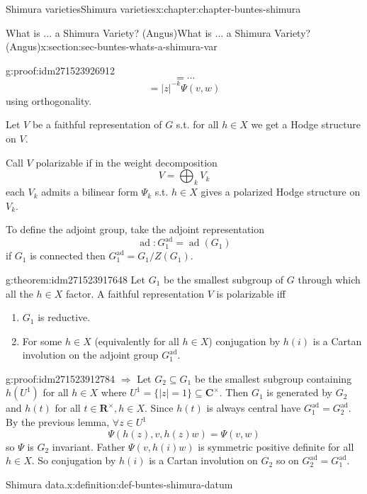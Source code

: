\documentclass[oneside,10pt,]{book}
\numberwithin{equation}{section}
\newcommand{\RR}{\mathbf{R}}
\newcommand{\CC}{\mathbf{C}}
\DeclareMathOperator{\ad}{ad}
\begin{document}
\begin{chapterptx}{Shimura varieties}{}{Shimura varieties}{}{}{x:chapter:chapter-buntes-shimura}
\begin{sectionptx}{What is ... a Shimura Variety? (Angus)}{}{What is ... a Shimura Variety? (Angus)}{}{}{x:section:sec-buntes-whats-a-shimura-var}
\begin{proofptx}{}{g:proof:idm271523926912}
\begin{equation*}
= \cdots
\end{equation*}
%
\begin{equation*}
= |z|^{-k} \Psi(v,w)
\end{equation*}
using orthogonality.%
\end{proofptx}
Let \(V \) be a faithful representation of \(G \) s.t. for all \(h\in X\) we get  a Hodge structure on \(V\).%
\par
Call \(V\) polarizable if in the weight decomposition%
\begin{equation*}
V = \bigoplus_k V_k
\end{equation*}
each \(V_k\) admits a bilinear form \(\Psi_k\) s.t. \(h \in X\) gives a polarized Hodge structure on \(V_k\).%
\par
To define the adjoint group, take the adjoint representation%
\begin{equation*}
\ad \colon G_1^{\ad} = \ad(G_1)
\end{equation*}
if \(G_1\) is connected then \(G_1^{\ad} = G_1 /Z(G_1)\).%
\begin{theorem}{}{}{g:theorem:idm271523917648}%
Let \(G_1\) be the smallest subgroup of \(G\) through  which all the \(h \in X\) factor. A faithful representation \(V\) is polarizable iff%
\begin{enumerate}
\item{}\(G_1\) is reductive.%
\item{}For some \(h \in X\) (equivalently for all \(h \in X\)) conjugation by \(h(i)\) is a Cartan involution on the adjoint group \(G_1^{\ad}\).%
\end{enumerate}
%
\end{theorem}
\begin{proofptx}{}{g:proof:idm271523912784}
\(\Rightarrow\) Let \(G_2 \subseteq G_1\) be the smallest subgroup containing \(h(U^1)\) for all \(h \in X\) where \(U^1 = \{|z| = 1\} \subseteq \CC^\times\). Then \(G_1\) is generated by \(G_2\) and \(h(t)\) for all \(t \in \RR^\times, h \in X\). Since \(h(t)\) is always central have \(G_1^{\ad}=  G_2^{\ad}\). By the previous lemma, \(\forall z  \in U^1\)%
\begin{equation*}
\Psi(h(z), v, h(z) w) = \Psi(v,w)
\end{equation*}
so \(\Psi\) is \(G_2\) invariant. Father \(\Psi(v, h(i) w)\) is symmetric positive definite for all \(h \in X\). So conjugation by \(h(i)\) is a Cartan involution on \(G_2\) so on \(G_2^{\ad} = G_1^{\ad}\).%
\end{proofptx}
\begin{definition}{Shimura data.}{x:definition:def-buntes-shimura-datum}%

\end{definition}
\end{sectionptx}
\end{chapterptx}
\end{document}
